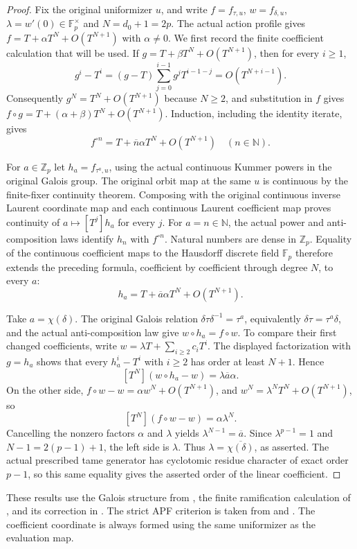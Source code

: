 \begin{proof}
Fix the original uniformizer $u$, and write $f=f_{\tau,u}$,
$w=f_{\delta,u}$, $\lambda=w'(0)\in\mathbb F_p^\times$ and
$N=d_0+1=2p$. The actual action profile gives
$f=T+\alpha T^N+O(T^{N+1})$ with $\alpha\ne0$.
We first record the finite coefficient calculation that will be used.
If $g=T+\beta T^N+O(T^{N+1})$, then for every $i\geq1$,
\[
 g^i-T^i=(g-T)\sum_{j=0}^{i-1}g^jT^{i-1-j}
       =O(T^{N+i-1}).
\]
Consequently $g^N=T^N+O(T^{N+1})$ because $N\geq2$, and substitution
in $f$ gives
$f\circ g=T+(\alpha+\beta)T^N+O(T^{N+1})$.
Induction, including the identity iterate, gives
\[
 f^{\circ n}=T+\overline n\alpha T^N+O(T^{N+1})
 \quad(n\in\mathbb N).
\]

For $a\in\mathbb Z_p$ let $h_a=f_{\tau^a,u}$, using the actual continuous
Kummer powers in the original Galois group. The original orbit map at
the same $u$ is continuous by the finite-fixer continuity theorem.
Composing with the original continuous inverse Laurent coordinate map
and each continuous Laurent coefficient map proves continuity of
$a\mapsto[T^j]h_a$ for every $j$. For $a=n\in\mathbb N$, the actual
power and anti-composition laws identify $h_n$ with $f^{\circ n}$.
Natural numbers are dense in $\mathbb Z_p$. Equality of the continuous
coefficient maps to the Hausdorff discrete field $\mathbb F_p$ therefore
extends the preceding formula, coefficient by coefficient through degree
$N$, to every $a$:
\[
 h_a=T+\overline a\alpha T^N+O(T^{N+1}).
\]

Take $a=\chi(\delta)$. The original Galois relation
$\delta\tau\delta^{-1}=\tau^a$, equivalently
$\delta\tau=\tau^a\delta$, and the actual anti-composition law give
$w\circ h_a=f\circ w$.
To compare their first changed coefficients, write
$w=\lambda T+\sum_{i\geq2}c_iT^i$.
The displayed factorization with $g=h_a$ shows that every
$h_a^i-T^i$ with $i\geq2$ has order at least $N+1$. Hence
\[
 [T^N](w\circ h_a-w)=\lambda\overline a\alpha.
\]
On the other side,
$f\circ w-w=\alpha w^N+O(T^{N+1})$, and
$w^N=\lambda^NT^N+O(T^{N+1})$, so
\[
 [T^N](f\circ w-w)=\alpha\lambda^N.
\]
Cancelling the nonzero factors $\alpha$ and $\lambda$ yields
$\lambda^{N-1}=\overline a$.
Since $\lambda^{p-1}=1$ and $N-1=2(p-1)+1$, the left side is
$\lambda$. Thus $\lambda=\overline{\chi(\delta)}$, as asserted.
The actual prescribed tame generator has cyclotomic residue character
of exact order $p-1$, so this same equality gives the asserted order of
the linear coefficient.
\end{proof}


These results use the Galois structure from \cite{Liu2008}, the finite
ramification calculation of \cite{Viviani2004}, and its correction in
\cite{Yuan}. The strict APF criterion is taken from \cite{Wintenberger1983}
and \cite{Sen1972}. The coefficient coordinate is always formed using the
same uniformizer as the evaluation map.
